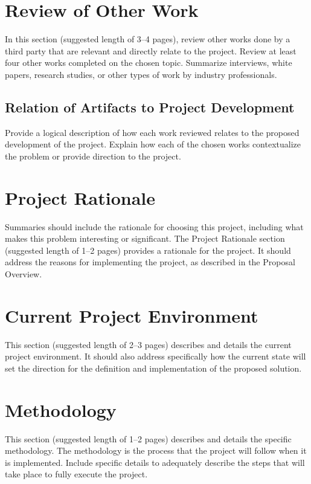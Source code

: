 \documentclass[12pt]{report}
\begin{document}
\chapter*{Review of Other Work}
In this section (suggested length of 3–4 pages), review other works done by a third party that are relevant and directly relate to the project. Review at least four other works completed on the chosen topic. Summarize interviews, white papers, research studies, or other types of work by industry professionals. 

\section*{Relation of Artifacts to Project Development}
Provide a logical description of how each work reviewed relates to the proposed development of the project. Explain how each of the chosen works contextualize the problem or provide direction to the project.

\chapter*{Project Rationale}
Summaries should include the rationale for choosing this project, including what makes this problem interesting or significant. The Project Rationale section (suggested length of 1–2 pages) provides a rationale for the project. It should address the reasons for implementing the project, as described in the Proposal Overview.

\chapter*{Current Project Environment}
This section (suggested length of 2–3 pages) describes and details the current project environment. It should also address specifically how the current state will set the direction for the definition and implementation of the proposed solution.

\chapter*{Methodology}
This section (suggested length of 1–2 pages) describes and details the specific methodology. The methodology is the process that the project will follow when it is implemented. Include specific details to adequately describe the steps that will take place to fully execute the project.
\end{document}
